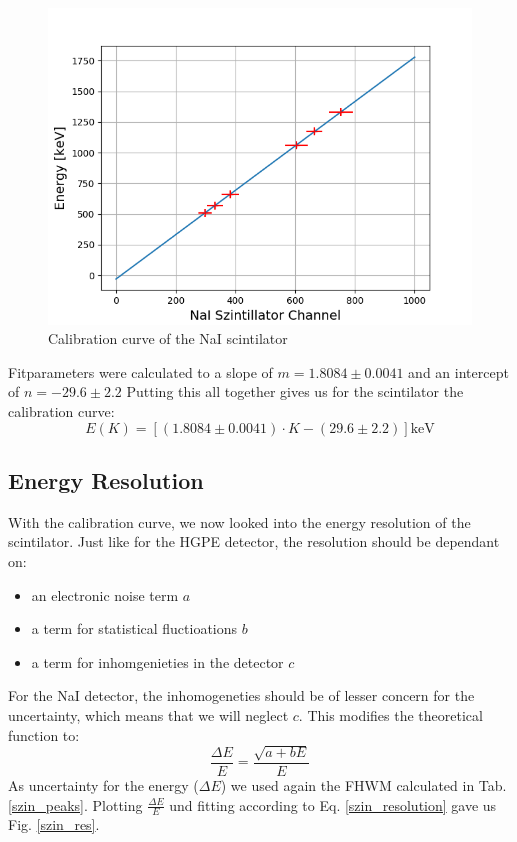 \begin{figure}[h]
  \includegraphics[width=\linewidth]{../plots/szin_kali.png}
  \caption{Calibration curve of the NaI scintilator}
  \label{szin_kali}
\end{figure}
Fitparameters were calculated to a slope of $m = 1.8084 \pm 0.0041$ and an intercept of $n = -29.6 \pm 2.2$
Putting this all together gives us for the scintilator the calibration curve:
\begin{equation}
E(K) = [(1.8084 \pm 0.0041) \cdot K - (29.6 \pm 2.2)]  \text{keV}
\end {equation}

\clearpage

\subsection{Energy Resolution}

With the calibration curve, we now looked into the energy resolution of the scintilator.
Just like for the HGPE detector, the resolution should be dependant on:
\begin{itemize}
\item an electronic noise term $a$
\item a term for statistical fluctioations $b$
\item a term for inhomgenieties in the detector $c$
\end{itemize}
For the NaI detector, the inhomogeneties should be of lesser concern for the uncertainty, which means that we will neglect $c$.
This modifies the theoretical function to:
\begin{equation}
\frac{\Delta E}{E} = \frac{\sqrt{a + bE }}{E}
\label{szin_resolution}
\end{equation}
As uncertainty for the energy ($\Delta E$) we used again the FHWM calculated in Tab. \ref{szin_peaks}.
Plotting $\frac{\Delta E}{E}$ und fitting according to Eq. \ref{szin_resolution} gave us Fig. \ref{szin_res}.

